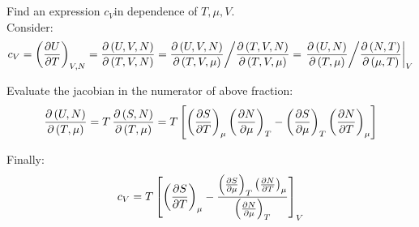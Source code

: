 \documentclass[11pt,a4paper]{scrartcl}
\newcommand{\thermpart}[3]{\left(\pdv{#1}{#2}\right)_{#3}}
\newcommand{\jactwo}[4]{\pdv{\left(#1,#2\right)}{\left(#3,#4\right)}}
\newcommand{\jacthree}[6]{\pdv{\left(#1,#2,#3\right)}{\left(#4,#5,#6\right)}}
\newcommand{\cV}{\ensuremath{c_V}}
\begin{document}
\newpage

\section{}

Find an expression \cV in dependence of $T, \mu, V$.\\

Consider:
\begin{equation*}
    \cV=\thermpart{U}{T}{V,N}=\jacthree{U}{V}{N}{T}{V}{N}
    =\jacthree{U}{V}{N}{T}{V}{\mu}\bigg/\jacthree{T}{V}{N}{T}{V}{\mu}
    =\left.\jactwo{U}{N}{T}{\mu}\bigg/\jactwo{N}{T}{\mu}{T}\right|_V
\end{equation*}

Evaluate the jacobian in the numerator of above fraction:
\begin{equation*}
    \jactwo{U}{N}{T}{\mu}=T\,\jactwo{S}{N}{T}{\mu}
    =T\left[\thermpart{S}{T}{\mu}\thermpart{N}{\mu}{T}-\thermpart{S}{\mu}{T}\thermpart{N}{T}{\mu}\right]
\end{equation*}

Finally:
\begin{equation*}
    \cV=T\left[\thermpart{S}{T}{\mu}-\frac{\thermpart{S}{\mu}{T}\thermpart{N}{T}{\mu}}{\thermpart{N}{\mu}{T}}\right]_V
\end{equation*}
\end{document}

